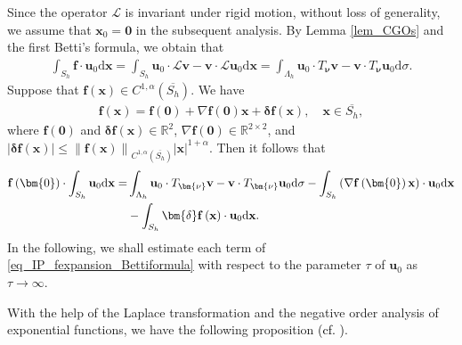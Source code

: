 \documentclass[11pt,reqno,oneside]{amsart}
\theoremstyle{definition}
\theoremstyle{remark}
\numberwithin{equation}{section}
\numberwithin{equation}{section}
\theoremstyle{remark}
\begin{document}
Since the operator $ \mathcal{L} $ is invariant under rigid motion, without loss of generality, we assume that $ \mathbf{x}_0 = \bm{0} $ in the subsequent analysis. By Lemma \ref{lem_CGOs} and the first Betti's formula, we obtain that
\begin{align} \label{eq_fu0=u0Tnuv_original}
	\int_{S_h} \mathbf{f} \cdot \mathbf{u}_0 \mathrm{d}\mathbf{x} = \int_{S_h} \mathbf{u}_0 \cdot \mathcal{L} \mathbf{v} - \mathbf{v} \cdot \mathcal{L} \mathbf{u}_0 \mathrm{d}\mathbf{x} = \int_{\Lambda_h} \mathbf{u}_0 \cdot T_{\bm{\nu}} \mathbf{v} - \mathbf{v} \cdot T_{\bm{\nu}} \mathbf{u}_0 \mathrm{d}\sigma.
\end{align}
Suppose that $ \mathbf{f}\left(\mathbf{x}\right) \in C^{1,\alpha} \left(\overline{S_h}\right) $. We have
\begin{align} \label{def_IP_f_C1alpha}
	\mathbf{f} \left(\mathbf{x}\right) = \mathbf{f} \left(\bm{0}\right) + \nabla \mathbf{f} \left(\bm{0}\right) \mathbf{x} + \bm{\delta} \mathbf{f} \left(\mathbf{x}\right) , \quad \mathbf{x}\in\overline{S_h}, 
\end{align}
where $ \mathbf{f}\left(\bm{0}\right) $ and $\bm{\delta}\mathbf{f}\left(\mathbf{x}\right) \in\mathbb{R}^2 $, $ \nabla\mathbf{f} \left(\bm{0}\right) \in\mathbb{R}^{2\times2} $, and $ \left| \bm{\delta} \mathbf{f} \left(\mathbf{x}\right) \right| \leqslant \left\| \mathbf{f} \left(\mathbf{x}\right) \right\|_{C^{1,\alpha}\left(\overline{S_h}\right)} \left| \mathbf{x} \right|^{1+\alpha} $. Then it follows that
\begin{align} \label{eq_IP_fexpansion_Bettiformula}
	\mathbf{f} \left(\bm{0}\right) \cdot \int_{S_h} \mathbf{u}_0 \mathrm{d}\mathbf{x} = & \int_{\Lambda_h} \mathbf{u}_0 \cdot T_{\bm{\nu}} \mathbf{v} - \mathbf{v} \cdot T_{\bm{\nu}} \mathbf{u}_0 \mathrm{d}\sigma - \int_{S_h} \left( \nabla \mathbf{f} \left(\bm{0}\right) \mathbf{x} \right) \cdot \mathbf{u}_0 \mathrm{d}\mathbf{x} \notag \\
	& - \int_{S_h} \bm{\delta} \mathbf{f} \left(\mathbf{x}\right) \cdot \mathbf{u}_0 \mathrm{d}\mathbf{x}.
\end{align}
In the following, we shall estimate each term of \eqref{eq_IP_fexpansion_Bettiformula} with respect to the parameter $\tau$ of $\mathbf u_0$ as $\tau \rightarrow \infty$. 

With the help of the Laplace transformation and the negative order analysis of exponential functions, we have the following proposition \textcolor{black}{(cf. \cite{diao2022further})}.
\end{document}
